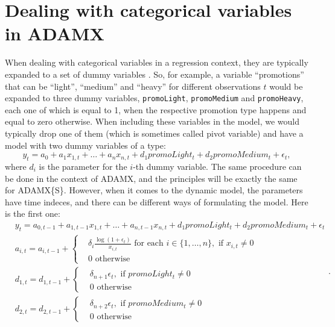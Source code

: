 \documentclass[]{book}
\theoremstyle{definition}
\theoremstyle{definition}
\theoremstyle{definition}
\theoremstyle{definition}
\theoremstyle{remark}
\begin{document}
\hypertarget{ETSXDynamicCategories}{%
\section{Dealing with categorical variables in ADAMX}\label{ETSXDynamicCategories}}

When dealing with categorical variables in a regression context, they are typically expanded to a set of dummy variables \citep[see Chapter 10 of][]{SvetunkovSBA}. So, for example, a variable ``promotions'' that can be ``light'', ``medium'' and ``heavy'' for different observations \(t\) would be expanded to three dummy variables, \texttt{promoLight}, \texttt{promoMedium} and \texttt{promoHeavy}, each one of which is equal to 1, when the respective promotion type happens and equal to zero otherwise. When including these variables in the model, we would typically drop one of them (which is sometimes called pivot variable) and have a model with two dummy variables of a type:
\begin{equation}
  y_t = a_0 + a_1 x_{1,t} + \dots + a_n x_{n,t} + d_1 promoLight_t + d_2 promoMedium_t + \epsilon_t,
  \label{eq:RegressionWithDummies}
\end{equation}
where \(d_i\) is the parameter for the \(i\)-th dummy variable. The same procedure can be done in the context of ADAMX, and the principles will be exactly the same for ADAMX\{S\}. However, when it comes to the dynamic model, the parameters have time indeces, and there can be different ways of formulating the model. Here is the first one:
\begin{equation}
  \begin{aligned}
    & y_{t} = a_{0,t-1} + a_{1,t-1} x_{1,t} + \dots + a_{n,t-1} x_{n,t} + d_1 promoLight_t + d_2 promoMedium_t + \epsilon_t \\
    & a_{i,t} = a_{i,t-1} + \left \lbrace \begin{aligned}
                  &\delta_i \frac{\log(1+\epsilon_t)}{x_{i,t}} \text{ for each } i \in \{1, \dots, n\}, \text{ if } x_{i,t}\neq 0 \\
                  &0 \text{ otherwise }
            \end{aligned} \right. \\
    & d_{1,t} = d_{1,t-1} + \left \lbrace \begin{aligned}
                  &\delta_{n+1} \epsilon_t, \text{ if } promoLight_t\neq 0 \\
                  &0 \text{ otherwise }
            \end{aligned} \right. \\
    & d_{2,t} = d_{2,t-1} + \left \lbrace \begin{aligned}
                  &\delta_{n+2} \epsilon_t, \text{ if } promoMedium_t\neq 0 \\
                  &0 \text{ otherwise }
            \end{aligned} \right.
  \end{aligned} .
  \label{eq:ETSXDynamicDummies01}
\end{equation}
\end{document}

